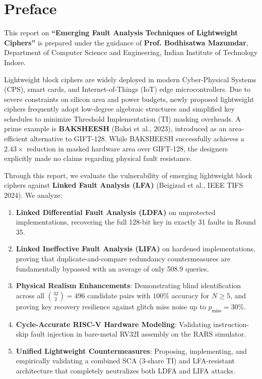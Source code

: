 \documentclass[12pt,a4paper,oneside]{report}
\begin{document}
\cleardoublepage

\chapter*{Preface}

This report on \textbf{``Emerging Fault Analysis Techniques of Lightweight Ciphers''} is prepared under the guidance of \textbf{Prof. Bodhisatwa Mazumdar}, Department of Computer Science and Engineering, Indian Institute of Technology Indore.

Lightweight block ciphers are widely deployed in modern Cyber-Physical Systems (CPS), smart cards, and Internet-of-Things (IoT) edge microcontrollers. Due to severe constraints on silicon area and power budgets, newly proposed lightweight ciphers frequently adopt low-degree algebraic structures and simplified key schedules to minimize Threshold Implementation (TI) masking overheads. A prime example is \textbf{BAKSHEESH} (Baksi et al., 2023), introduced as an area-efficient alternative to GIFT-128. While BAKSHEESH successfully achieves a $2.43\times$ reduction in masked hardware area over GIFT-128, the designers explicitly made no claims regarding physical fault resistance.

Through this report, we evaluate the vulnerability of emerging lightweight block ciphers against \textbf{Linked Fault Analysis (LFA)} (Beigizad et al., IEEE TIFS 2024). We analyze:
\begin{enumerate}
    \item \textbf{Linked Differential Fault Analysis (LDFA)} on unprotected implementations, recovering the full 128-bit key in exactly 31 faults in Round 35.
    \item \textbf{Linked Ineffective Fault Analysis (LIFA)} on hardened implementations, proving that duplicate-and-compare redundancy countermeasures are fundamentally bypassed with an average of only 508.9 queries.
    \item \textbf{Physical Realism Enhancements}: Demonstrating blind identification across all $\binom{32}{2} = 496$ candidate pairs with $100\%$ accuracy for $N \ge 5$, and proving key recovery resilience against glitch miss noise up to $p_{\text{miss}} = 30\%$.
    \item \textbf{Cycle-Accurate RISC-V Hardware Modeling}: Validating instruction-skip fault injection in bare-metal RV32I assembly on the RARS simulator.
    \item \textbf{Unified Lightweight Countermeasures}: Proposing, implementing, and empirically validating a combined SCA (3-share TI) and LFA-resistant architecture that completely neutralizes both LDFA and LIFA attacks.
\end{enumerate}
\end{document}
